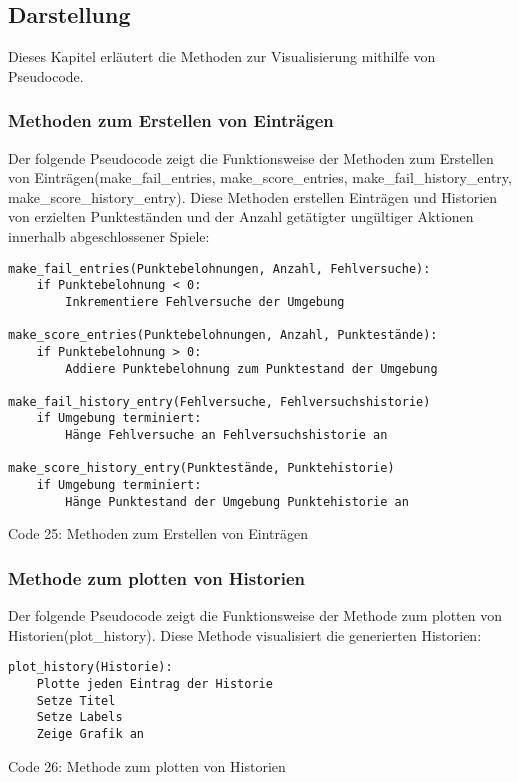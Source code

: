 \subsection{Darstellung}
Dieses Kapitel erläutert die Methoden zur Visualisierung mithilfe von Pseudocode.
\subsubsection{Methoden zum Erstellen von Einträgen}
\begin{minipage}{\linewidth}
Der folgende Pseudocode zeigt die Funktionsweise der Methoden zum Erstellen von Einträgen(make\_fail\_entries, make\_score\_entries, make\_fail\_history\_entry, make\_score\_history\_entry). Diese Methoden erstellen Einträgen und Historien von erzielten Punkteständen und der Anzahl getätigter ungültiger Aktionen innerhalb abgeschlossener Spiele:
\vspace{0.5cm}
\begin{lstlisting}
make_fail_entries(Punktebelohnungen, Anzahl, Fehlversuche):
	if Punktebelohnung < 0:
		Inkrementiere Fehlversuche der Umgebung

make_score_entries(Punktebelohnungen, Anzahl, Punktestände):
	if Punktebelohnung > 0:
		Addiere Punktebelohnung zum Punktestand der Umgebung

make_fail_history_entry(Fehlversuche, Fehlversuchshistorie)
	if Umgebung terminiert:
		Hänge Fehlversuche an Fehlversuchshistorie an
		
make_score_history_entry(Punktestände, Punktehistorie)
	if Umgebung terminiert:
		Hänge Punktestand der Umgebung Punktehistorie an
\end{lstlisting}
Code 25: Methoden zum Erstellen von Einträgen\\
\end{minipage}
\subsubsection{Methode zum plotten von Historien}
\begin{minipage}{\linewidth}
Der folgende Pseudocode zeigt die Funktionsweise der Methode zum plotten von Historien(plot\_history). Diese Methode visualisiert die generierten Historien:
\vspace{0.5cm}
\begin{lstlisting}
plot_history(Historie):
	Plotte jeden Eintrag der Historie
	Setze Titel
	Setze Labels
	Zeige Grafik an
\end{lstlisting}
Code 26: Methode zum plotten von Historien\\
\end{minipage}
